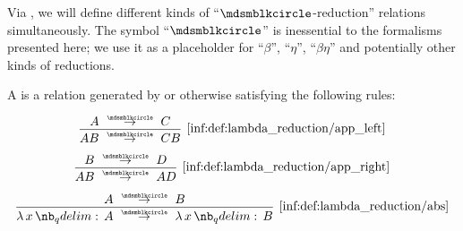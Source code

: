 \begin{definition}\label{def:lambda_reduction}
  Via , we will define different kinds of \enquote{\( {\Anon} \)-reduction} relations simultaneously. The symbol \enquote{\( {\Anon} \)} is inessential to the formalisms presented here; we use it as a placeholder for \enquote{\( \beta \)}, \enquote{\( \eta \)}, \enquote{\( \beta\eta \)} and potentially other kinds of reductions.

  \begin{thmenum}
     A  is a relation generated by or otherwise satisfying the following rules:
    \begin{paracol}{3}
      \begin{nthcolumn}{0}
        \begin{equation*}\taglabel[\ensuremath{ \logic{App}_{\Anon}^L }]{inf:def:lambda_reduction/app_left}
          \begin{prooftree}
            \hypo{ A \pred C }
            \infer1[\ref{inf:def:lambda_reduction/app_left}]{ AB \pred CB }
          \end{prooftree}
        \end{equation*}
      \end{nthcolumn}

      \begin{nthcolumn}{1}
        \begin{equation*}\taglabel[\ensuremath{ \logic{App}_{\Anon}^R }]{inf:def:lambda_reduction/app_right}
          \begin{prooftree}
            \hypo{ B \pred D }
            \infer1[\ref{inf:def:lambda_reduction/app_right}]{ AB \pred AD }
          \end{prooftree}
        \end{equation*}
      \end{nthcolumn}

      \begin{nthcolumn}{2}
        \begin{equation*}\taglabel[\ensuremath{ \logic{Abs}_{\Anon} }]{inf:def:lambda_reduction/abs}
          \begin{prooftree}
            \hypo{ A \pred B }
            \infer1[\ref{inf:def:lambda_reduction/abs}]{ \qabs x A \pred \qabs x B }
          \end{prooftree}
        \end{equation*}
      \end{nthcolumn}
    \end{paracol}


\end{thmenum}
\end{definition}

